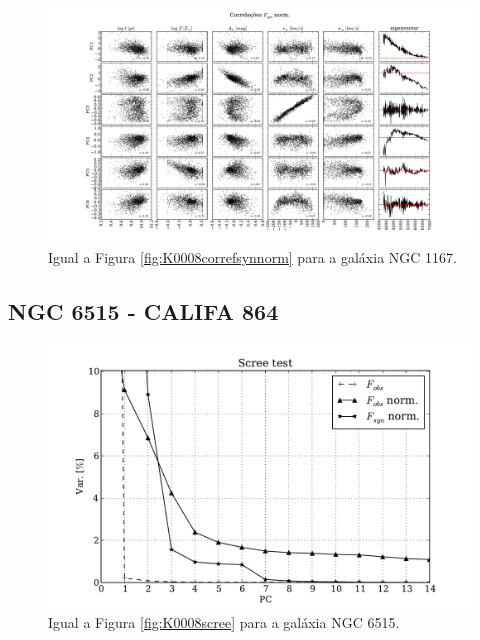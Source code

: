 \begin{figure}
    \includegraphics[width=1.3\textwidth, angle=-90]{figuras/K0119-correl-f_syn_norm-PCvsPhys.pdf}
	\caption[Correlações PCs vs. par\^ametros f\'isicos - $F_{syn}$ norm. - NGC 1167.]
	{Igual a Figura \ref{fig:K0008correfsynnorm} para a galáxia NGC 1167.}
    \label{fig:K0119correfsynnorm}
\end{figure}

\subsection{NGC 6515 - CALIFA 864}

\begin{figure}
    \includegraphics[height=0.33\textheight]{figuras/K0864-screetest.pdf}
    \caption[Scree test comparativo entre 3 PCAs - NGC 6515.]
	{Igual a Figura \ref{fig:K0008scree} para a galáxia NGC 6515.}
    \label{fig:K0864scree}
\end{figure}

